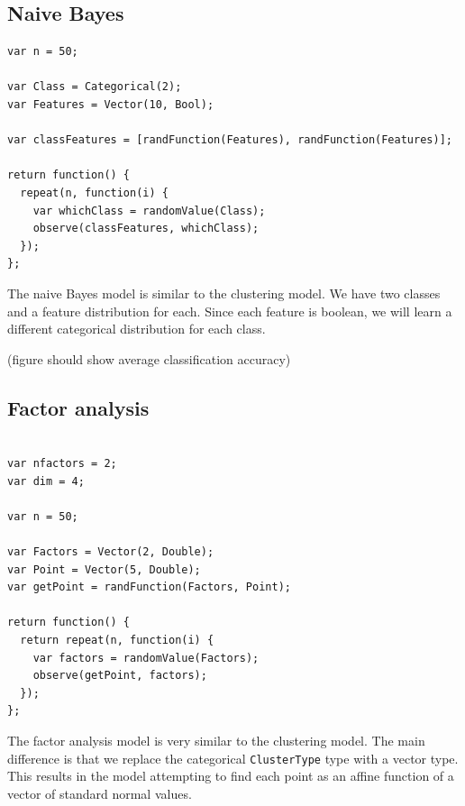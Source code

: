 \documentclass{article}
\begin{document}
% 

\subsection{Naive Bayes}

{\small
\begin{lstlisting}
var n = 50;

var Class = Categorical(2);
var Features = Vector(10, Bool);

var classFeatures = [randFunction(Features), randFunction(Features)];

return function() {
  repeat(n, function(i) {
    var whichClass = randomValue(Class);
    observe(classFeatures, whichClass);
  });
};
\end{lstlisting}
}

The naive Bayes model is similar to the clustering model.  We have two classes and a feature
distribution for each.  Since each feature is boolean, we will learn
a different categorical distribution for each class.

(figure should show average classification accuracy)

  \subsection{Factor analysis}
{\small
\begin{lstlisting}

var nfactors = 2;
var dim = 4;

var n = 50;

var Factors = Vector(2, Double);
var Point = Vector(5, Double);
var getPoint = randFunction(Factors, Point);

return function() {
  return repeat(n, function(i) {
    var factors = randomValue(Factors);
    observe(getPoint, factors);
  });
};
\end{lstlisting}
}

The factor analysis model is very similar to the clustering model.  The main difference is that we replace the categorical \texttt{ClusterType} type with a vector type.  This results in the model attempting to find each point as an affine function of a vector of standard normal values.
\end{document}
